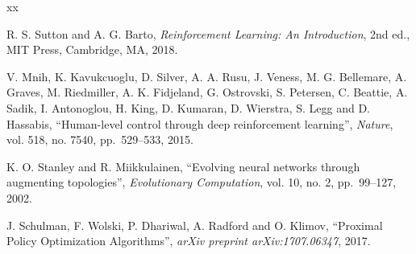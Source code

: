 \documentclass[a4paper,12pt,oneside]{book}
\renewcommand{\baselinestretch}{1.4}
\begin{document}
\appendix

\def\baselinestretch{1}
\vspace{-2cm}
\renewcommand{\bibname}{Tài liệu tham khảo}
\clearpage
{}
{}
\renewcommand{\refname}{Literary works}
\begin{thebibliography}{xx}
	
	
	R. S. Sutton and A. G. Barto, {\em Reinforcement Learning: An Introduction}, 2nd ed.,
	MIT Press, Cambridge, MA, 2018.

	V. Mnih, K. Kavukcuoglu, D. Silver, A. A. Rusu, J. Veness, M. G. Bellemare, A. Graves,
	M. Riedmiller, A. K. Fidjeland, G. Ostrovski, S. Petersen, C. Beattie, A. Sadik,
	I. Antonoglou, H. King, D. Kumaran, D. Wierstra, S. Legg and D. Hassabis,
	``Human-level control through deep reinforcement learning'',
	{\em Nature}, vol. 518, no. 7540, pp.~529--533, 2015.

	K. O. Stanley and R. Miikkulainen, ``Evolving neural networks through augmenting topologies'',
	{\em Evolutionary Computation}, vol. 10, no. 2, pp.~99--127, 2002.

	J. Schulman, F. Wolski, P. Dhariwal, A. Radford and O. Klimov, ``Proximal Policy Optimization Algorithms'',
	{\em arXiv preprint arXiv:1707.06347}, 2017.


\end{thebibliography}
\end{document}
